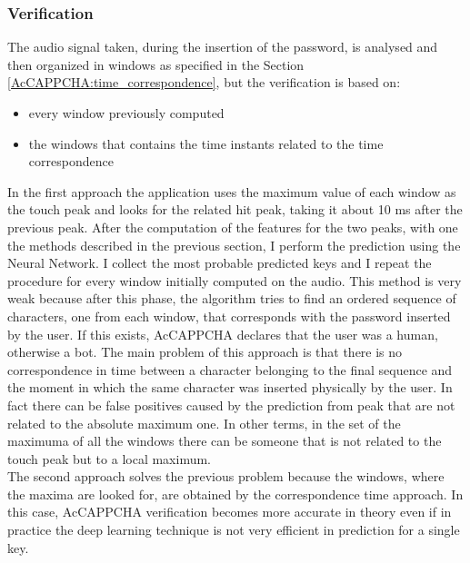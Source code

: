 \subsubsection{Verification}
The audio signal taken, during the insertion of the password, is analysed and then organized in windows as specified in the Section \ref{AcCAPPCHA:time_correspondence}, but the verification is based on:
\begin{itemize}
\item{every window previously computed}
\item{the windows that contains the time instants related to the time correspondence}
\end{itemize}
In the first approach the application uses the maximum value of each window as the touch peak and looks for the related hit peak, taking it about 10 ms after the previous peak. After the computation of the features for the two peaks, with one the methods described in the previous section, I perform the prediction using the Neural Network. I collect the most probable predicted keys and I repeat the procedure for every window initially computed on the audio. This method is very weak because after this phase, the algorithm tries to find an ordered sequence of characters, one from each window, that corresponds with the password inserted by the user. If this exists, AcCAPPCHA declares that the user was a human, otherwise a bot. The main problem of this approach is that there is no correspondence in time between a character belonging to the final sequence and the moment in which the same character was inserted physically by the user. In fact there can be false positives caused by the prediction from peak that are not related to the absolute maximum one. In other terms, in the set of the maximuma of all the windows there can be someone that is not related to the touch peak but to a local maximum.\\
The second approach solves the previous problem because the windows, where the maxima are looked for, are obtained by the correspondence time approach. In this case, AcCAPPCHA verification becomes more accurate in theory even if in practice the deep learning technique is not very efficient in prediction for a single key.

